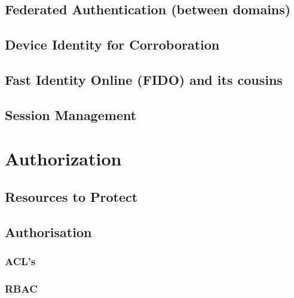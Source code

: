 \hypertarget{federated-authentication-between-domains}{%
\subsection{Federated Authentication (between
domains)}\label{federated-authentication-between-domains}}

\hypertarget{device-identity-for-corroboration}{%
\subsection{Device Identity for
Corroboration}\label{device-identity-for-corroboration}}

\hypertarget{fast-identity-online-fido-and-its-cousins}{%
\subsection{Fast Identity Online (FIDO) and its
cousins}\label{fast-identity-online-fido-and-its-cousins}}

\hypertarget{session-management}{%
\subsection{Session Management}\label{session-management}}

\hypertarget{authorization}{%
\section{Authorization}\label{authorization}}

\hypertarget{resources-to-protect}{%
\subsection{Resources to Protect}\label{resources-to-protect}}

\hypertarget{authorisation}{%
\subsection{Authorisation}\label{authorisation}}

\hypertarget{acls}{%
\subsubsection{ACL's}\label{acls}}

\hypertarget{rbac}{%
\subsubsection{RBAC}\label{rbac}}

